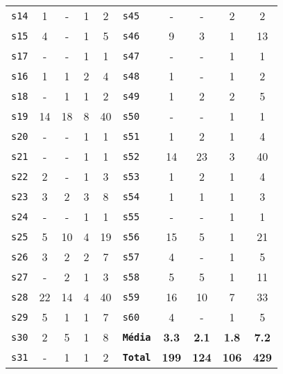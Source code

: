 \begin{longtable}{ l c c c c | l c c c c }
\texttt{s14} & 1 & - & 1 & 2 & \texttt{s45} & - & - & 2 & 2 \\
\texttt{s15} & 4 & - & 1 & 5 & \texttt{s46} & 9 & 3 & 1 & 13 \\
\texttt{s17} & - & - & 1 & 1 & \texttt{s47} & - & - & 1 & 1 \\
\texttt{s16} & 1 & 1 & 2 & 4 & \texttt{s48} & 1 & - & 1 & 2 \\
\texttt{s18} & - & 1 & 1 & 2 & \texttt{s49} & 1 & 2 & 2 & 5 \\
\texttt{s19} & 14 & 18 & 8 & 40 & \texttt{s50} & - & - & 1 & 1 \\
\texttt{s20} & - & - & 1 & 1 & \texttt{s51} & 1 & 2 & 1 & 4 \\
\texttt{s21} & - & - & 1 & 1 & \texttt{s52} & 14 & 23 & 3 & 40 \\
\texttt{s22} & 2 & - & 1 & 3 & \texttt{s53} & 1 & 2 & 1 & 4 \\
\texttt{s23} & 3 & 2 & 3 & 8 & \texttt{s54} & 1 & 1 & 1 & 3 \\
\texttt{s24} & - & - & 1 & 1 & \texttt{s55} & - & - & 1 & 1 \\
\texttt{s25} & 5 & 10 & 4 & 19 & \texttt{s56} & 15 & 5 & 1 & 21 \\
\texttt{s26} & 3 & 2 & 2 & 7 & \texttt{s57} & 4 & - & 1 & 5 \\
\texttt{s27} & - & 2 & 1 & 3 & \texttt{s58} & 5 & 5 & 1 & 11 \\
\texttt{s28} & 22 & 14 & 4 & 40 & \texttt{s59} & 16 & 10 & 7 & 33 \\
\texttt{s29} & 5 & 1 & 1 & 7 & \texttt{s60} & 4 & - & 1 & 5 \\
\texttt{s30} & 2 & 5 & 1 & 8 & \texttt{{\bf Média}} & {\bf 3.3} & {\bf 2.1} & {\bf 1.8} & {\bf 7.2} \\
\texttt{s31} & - & 1 & 1 & 2 & \texttt{{\bf Total}} & {\bf 199} & {\bf 124} & {\bf 106} & {\bf 429} \\
\end{longtable}

